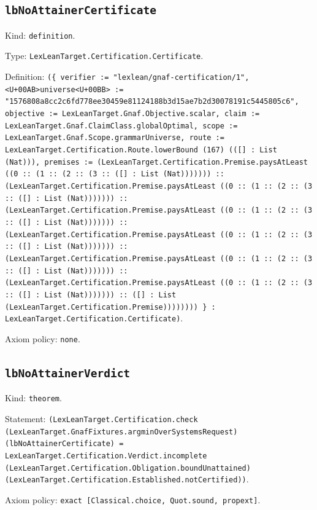 \documentclass[11pt]{article}
\begin{document}
\subsection*{\texttt{lbNoAttainerCertificate}}
\noindent Kind: \texttt{definition}.\par
\noindent Type: \texttt{LexLeanTarget.Certification.Certificate}.\par
\noindent Definition: \texttt{(\{ verifier := "lexlean/gnaf-certification/1", <U+00AB>universe<U+00BB> := "1576808a8cc2c6fd778ee30459e81124188b3d15ae7b2d30078191c5445805c6", objective := LexLeanTarget.Gnaf.Objective.scalar, claim := LexLeanTarget.Gnaf.ClaimClass.globalOptimal, scope := LexLeanTarget.Gnaf.Scope.grammarUniverse, route := LexLeanTarget.Certification.Route.lowerBound (167) (([] : List (Nat))), premises := (LexLeanTarget.Certification.Premise.paysAtLeast ((0 :: (1 :: (2 :: (3 :: ([] : List (Nat))))))) :: (LexLeanTarget.Certification.Premise.paysAtLeast ((0 :: (1 :: (2 :: (3 :: ([] : List (Nat))))))) :: (LexLeanTarget.Certification.Premise.paysAtLeast ((0 :: (1 :: (2 :: (3 :: ([] : List (Nat))))))) :: (LexLeanTarget.Certification.Premise.paysAtLeast ((0 :: (1 :: (2 :: (3 :: ([] : List (Nat))))))) :: (LexLeanTarget.Certification.Premise.paysAtLeast ((0 :: (1 :: (2 :: (3 :: ([] : List (Nat))))))) :: (LexLeanTarget.Certification.Premise.paysAtLeast ((0 :: (1 :: (2 :: (3 :: ([] : List (Nat))))))) :: ([] : List (LexLeanTarget.Certification.Premise)))))))) \} : LexLeanTarget.Certification.Certificate)}.\par
\noindent Axiom policy: \texttt{none}.\par
\subsection*{\texttt{lbNoAttainerVerdict}}
\noindent Kind: \texttt{theorem}.\par
\noindent Statement: \texttt{(LexLeanTarget.Certification.check (LexLeanTarget.GnafFixtures.argminOverSystemsRequest) (lbNoAttainerCertificate) = LexLeanTarget.Certification.Verdict.incomplete (LexLeanTarget.Certification.Obligation.boundUnattained) (LexLeanTarget.Certification.Established.notCertified))}.\par
\noindent Axiom policy: \texttt{exact [Classical.choice, Quot.sound, propext]}.\par
\end{document}
